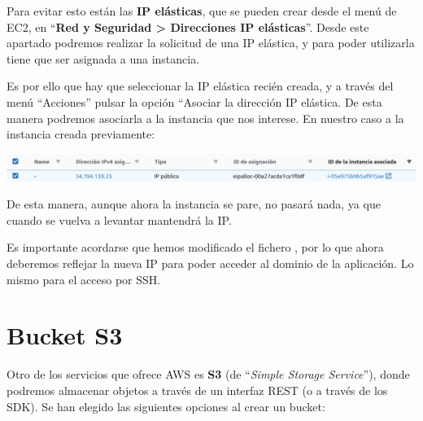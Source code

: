 \documentclass{\ClassPath/viu-tfm-template}
\begin{document}
Para evitar esto están las \textbf{IP elásticas}, que se pueden crear desde el menú de EC2, en “\textbf{Red y Seguridad > Direcciones IP elásticas}”. Desde este apartado podremos realizar la solicitud de una IP elástica, y para poder utilizarla tiene que ser asignada a una instancia.

Es por ello que hay que seleccionar la IP elástica recién creada, y a través del menú “Acciones” pulsar la opción “Asociar la dirección IP elástica. De esta manera podremos asociarla a la instancia que nos interese. En nuestro caso a la instancia creada previamente:

\begin{center}
    \includegraphics[frame,width=\linewidth]{img/ip_elastica.png}
\end{center}

De esta manera, aunque ahora la instancia se pare, no pasará nada, ya que cuando se vuelva a levantar mantendrá la IP.

Es importante acordarse que hemos modificado el fichero , por lo que ahora deberemos reflejar la nueva IP para poder acceder al dominio de la aplicación. Lo mismo para el acceso por SSH.


\chapter{Bucket S3}

Otro de los servicios que ofrece AWS es \textbf{S3} (de “\textit{Simple Storage Service}”), donde podremos almacenar objetos a través de un interfaz REST (o a través de los SDK). Se han elegido las siguientes opciones al crear un bucket:

\end{document}
